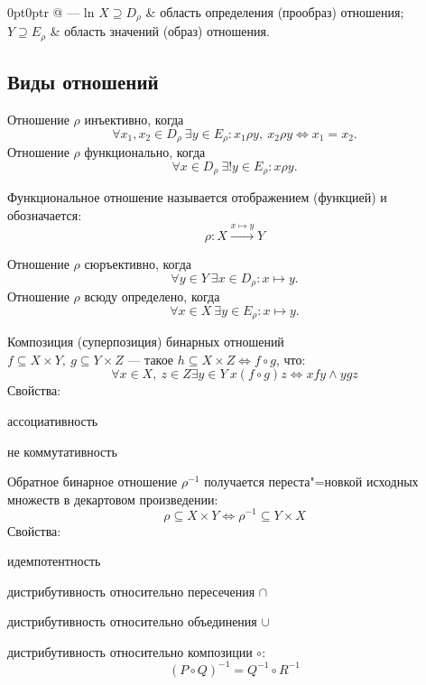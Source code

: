 \begin{tabularc}{0pt}{0pt}{r @{ --- } l}{n}
$X\supseteq D_\rho$ & область определения {\ital (прообраз)} отношения;\\
$Y\supseteq E_\rho$ & область значений {\ital (образ)} отношения.
\end{tabularc} 

\subsection{Виды отношений}

Отношение $\rho$ {\ital инъективно}, когда
$$\forall x_1,x_2\in D_\rho\ \exists y\in E_\rho\colon x_1\rho y,\ x_2\rho y\iff
x_1=x_2.$$
Отношение $\rho$ {\ital функционально}, когда
$$\forall x\in D_\rho\ \exists! y\in E_\rho\colon x\rho y.$$
\begin{theorem}
Функциональное отношение называется {\bold отображением} {\ital (функцией)}
и обозначается:
$$\rho\colon X\xrightarrow{x\mapsto y} Y$$
\end{theorem}
Отношение $\rho$ {\ital сюръективно}, когда
$$\forall y\in Y\ \exists x\in D_\rho\colon x\mapsto y.$$
Отношение $\rho$ {\ital всюду определено}, когда
$$\forall x\in X\ \exists y\in E_\rho\colon x\mapsto y.$$
\begin{theorem}
{\bold Композиция} {\ital (суперпозиция)} бинарных отношений\\ $f\subseteq X\times Y,\ g\subseteq Y\times Z$ --- такое $h\subseteq X\times Z\iff f\circ g$, что:
$$\forall x\in X,\ z\in Z\exists y\in Y\ x(f\circ g)z\iff xfy\land ygz$$
Свойства:

\begin{list*}
\item ассоциативность
\item {\ital *не коммутативность}
\end{list*}
\end{theorem}

\begin{theorem}
{\bold Обратное} бинарное отношение $\rho^{-1}$ получается переста"=новкой исходных множеств в декартовом произведении:
$$\rho\subseteq X\times Y\iff\rho^{-1}\subseteq Y\times X$$
Свойства:
\begin{list*}
\item идемпотентность
\item дистрибутивность относительно {\ital пересечения} $\cap$
\item дистрибутивность относительно {\ital объединения} $\cup$
\item дистрибутивность относительно {\ital композиции} $\circ$:
$$(P\circ Q)^{-1}=Q^{-1}\circ R^{-1}$$
\end{list*}
\end{theorem}

